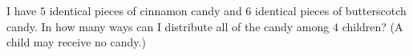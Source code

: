 I have $5$ identical pieces of cinnamon candy and $6$ identical pieces of butterscotch candy. In how many ways can I distribute all of the candy among $4$ children? (A child may receive no candy.)
